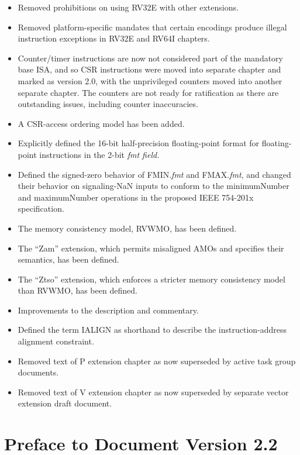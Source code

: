 \begin{itemize}
\item Removed prohibitions on using RV32E with other extensions.
\item Removed platform-specific mandates that certain encodings
  produce illegal instruction exceptions in RV32E and RV64I chapters.
\item Counter/timer instructions are now not considered part of the
  mandatory base ISA, and so CSR instructions were moved into separate
  chapter and marked as version 2.0, with the unprivileged counters
  moved into another separate chapter.  The counters are not ready for
  ratification as there are outstanding issues, including counter
  inaccuracies.
\item A CSR-access ordering model has been added.
\item Explicitly defined the 16-bit half-precision floating-point
  format for floating-point instructions in the 2-bit {\em fmt field.}
\item Defined the signed-zero behavior of FMIN.{\em fmt} and FMAX.{\em fmt},
  and changed their behavior on signaling-NaN inputs to conform to the
  minimumNumber and maximumNumber operations in the proposed IEEE 754-201x
  specification.
\item The memory consistency model, RVWMO, has been defined.
\item The ``Zam'' extension, which permits misaligned AMOs and specifies their semantics, has been defined.
\item The ``Ztso'' extension, which enforces a stricter memory consistency model than RVWMO, has been defined.
\item Improvements to the description and commentary.
\item Defined the term IALIGN as shorthand to describe the instruction-address
  alignment constraint.
\item Removed text of P extension chapter as now superseded by active task
  group documents.
\item Removed text of V extension chapter as now superseded by separate vector
  extension draft document.
\end{itemize}

\FloatBarrier

\section*{Preface to Document Version 2.2}

